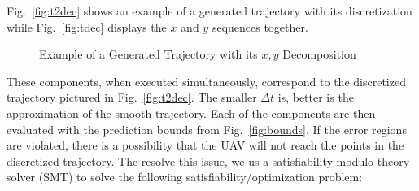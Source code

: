 \documentclass[letterpaper, 10 pt, conference]{ieeeconf}  %
\begin{document}
Fig.~\ref{fig:t2dec} shows an example of a generated trajectory with its discretization while Fig.~\ref{fig:tdec} displays the $x$ and $y$ sequences together.
\begin{figure}[ht]
	\centering
	\caption{Example of a Generated Trajectory with its $x,y$ Decomposition}
	\label{fig:trajdec}
\end{figure}

These components, when executed simultaneously, correspond to the discretized trajectory pictured in Fig.~\ref{fig:t2dec}. The smaller $\Delta t$ is, better is the approximation of the smooth trajectory. Each of the components are then evaluated with the prediction bounds from Fig.~\ref{fig:bounds}. If the error regions are violated, there is a possibility that the UAV will not reach the points in the discretized trajectory. The resolve this issue, we us a satisfiability modulo theory solver (SMT) to solve the following satisfiability/optimization problem: %

\end{document}

